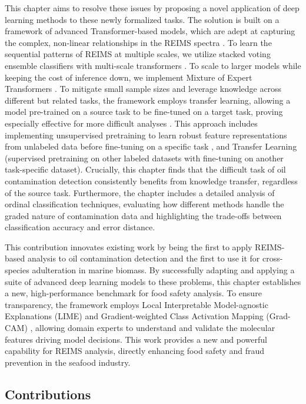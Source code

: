 This chapter aims to resolve these issues by proposing a novel application of deep learning methods to these newly formalized tasks. The solution is built on a framework of advanced Transformer-based models, which are adept at capturing the complex, non-linear relationships in the REIMS spectra \citep{Vaswani2017}. To learn the sequential patterns of REIMS at multiple scales, we utilize stacked voting ensemble classifiers with multi-scale transformers \citep{Wolpert1992}. To scale to larger models while keeping the cost of inference down, we implement Mixture of Expert Transformers \citep{Jacobs1991,Kaiser2017}. To mitigate small sample sizes and leverage knowledge across different but related tasks, the framework employs transfer learning, allowing a model pre-trained on a source task to be fine-tuned on a target task, proving especially effective for more difficult analyses \citep{Bozinovski1976,Tan2018}. This approach includes implementing unsupervised pretraining to learn robust feature representations from unlabeled data before fine-tuning on a specific task \citep{Devlin2018}, and Transfer Learning (supervised pretraining on other labeled datasets with fine-tuning on another task-specific dataset\citep{Tan2018}). Crucially, this chapter finds that the difficult task of oil contamination detection consistently benefits from knowledge transfer, regardless of the source task. Furthermore, the chapter includes a detailed analysis of ordinal classification techniques, evaluating how different methods handle the graded nature of contamination data and highlighting the trade-offs between classification accuracy and error distance.

This contribution innovates existing work by being the first to apply REIMS-based analysis to oil contamination detection and the first to use it for cross-species adulteration in marine biomass. By successfully adapting and applying a suite of advanced deep learning models to these problems, this chapter establishes a new, high-performance benchmark for food safety analysis. To ensure transparency, the framework employs Local Interpretable Model-agnostic Explanations (LIME) \citep{Ribeiro2016} and Gradient-weighted Class Activation Mapping (Grad-CAM) \citep{Selvaraju2017}, allowing domain experts to understand and validate the molecular features driving model decisions. This work provides a new and powerful capability for REIMS analysis, directly enhancing food safety and fraud prevention in the seafood industry.

\subsection{Contributions}

